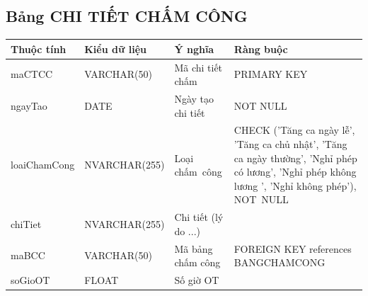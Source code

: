 \documentclass[a4paper,12pt]{report}
\begin{document}
\subsection{Bảng CHI TIẾT CHẤM CÔNG}
\noindent
\begin{center}
    \begin{longtable}{|>{\centering\arraybackslash}p{3cm}|
        >{\centering\arraybackslash}p{4cm}|
        >{\centering\arraybackslash}p{3.5cm}|
        >{\centering\arraybackslash}p{4.5cm}|}
        \hline
        \textbf{Thuộc tính}                                                                                                               &
        \textbf{Kiểu dữ liệu}                                                                                                                             &
        \textbf{Ý nghĩa}                                                                                                 &
        \textbf{Ràng buộc}                                                                                                         \\
        \hline
        maCTCC &  VARCHAR(50)  & Mã chi tiết chấm & PRIMARY KEY \\
        \hline
        ngayTao &  DATE  & Ngày tạo chi tiết & NOT NULL \\                                                                                                                          
        \hline
        loaiChamCong &  NVARCHAR(255)  & Loại chấm~công & CHECK ('Tăng ca ngày lễ', 'Tăng ca chủ nhật', 'Tăng ca ngày thường', 'Nghỉ phép có lương', 'Nghỉ phép không lương ', 'Nghỉ không phép'), NOT~NULL \\                                                                                                                          
        \hline
        chiTiet &  NVARCHAR(255)  & Chi tiết (lý do ...) & \\                                                                                                                          
        \hline
        maBCC &  VARCHAR(50)  & Mã bảng chấm công & FOREIGN KEY references BANGCHAMCONG \\                                                                                                                          
        \hline
        soGioOT &  FLOAT  & Số giờ OT & \\                                                                                                                          
        \hline
    \end{longtable}
\end{center}
\end{document}
